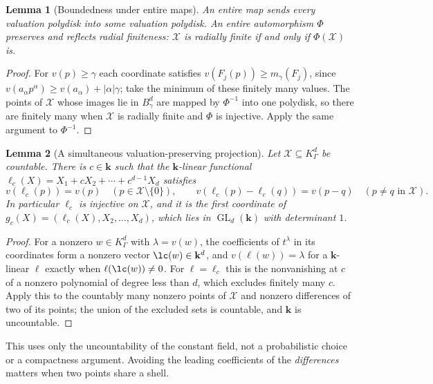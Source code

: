 \documentclass[11pt]{article}
\theoremstyle{plain}
\newtheorem{lemma}[lemma]{Lemma}
\theoremstyle{plain}
\theoremstyle{plain}
\theoremstyle{definition}
\theoremstyle{definition}
\theoremstyle{definition}
\theoremstyle{definition}
\theoremstyle{remark}
\newcommand{\K}{K_\Gamma}\newcommand{\KD}{K_\Delta}
\newcommand{\kk}{\mathbf k}\newcommand{\PP}{\mathbb P}
\begin{document}
\begin{lemma}[Boundedness under entire maps]\label{ent:rc:lem:boundedness}
An entire map sends every valuation polydisk into some valuation polydisk.
An entire automorphism $\Phi$ preserves and reflects radial finiteness:
$\mathcal X$ is radially finite if and only if $\Phi(\mathcal X)$ is.
\end{lemma}
\begin{proof}
For $v(p)\ge\gamma$ each coordinate satisfies $v(F_j(p))\ge m_\gamma(F_j)$,
since $v(a_\alpha p^\alpha)\ge v(a_\alpha)+|\alpha|\gamma$; take the minimum of
these finitely many values. The points of $\mathcal X$ whose images lie in
$B^d_\gamma$ are mapped by $\Phi^{-1}$ into one polydisk, so there are finitely
many when $\mathcal X$ is radially finite and $\Phi$ is injective. Apply the
same argument to $\Phi^{-1}$.
\end{proof}

\begin{lemma}[A simultaneous valuation-preserving projection]
\label{ent:rc:lem:projection}
Let $\mathcal X\subseteq\K^d$ be countable. There is $c\in\kk$ such that the
$\kk$-linear functional $\ell_c(X)=X_1+cX_2+\cdots+c^{d-1}X_d$ satisfies
\begin{equation}\label{ent:rc:eq:project}
 v(\ell_c(p))=v(p)\quad(p\in\mathcal X\setminus\{0\}),\qquad
 v(\ell_c(p)-\ell_c(q))=v(p-q)\quad(p\ne q\text{ in }\mathcal X).
\end{equation}
In particular $\ell_c$ is injective on $\mathcal X$, and it is the first
coordinate of $g_c(X)=(\ell_c(X),X_2,\ldots,X_d)$, which lies in
$\operatorname{GL}_d(\kk)$ with determinant $1$.
\end{lemma}
\begin{proof}
For a nonzero $w\in\K^d$ with $\lambda=v(w)$, the coefficients of $t^\lambda$
in its coordinates form a nonzero vector $\lc(w)\in\kk^d$, and
$v(\ell(w))=\lambda$ for a $\kk$-linear $\ell$ exactly when
$\ell(\lc(w))\ne0$. For $\ell=\ell_c$ this is the nonvanishing
at $c$ of a nonzero polynomial of degree less than $d$, which excludes finitely
many $c$. Apply this to the countably many nonzero points of $\mathcal X$ and
nonzero differences of two of its points; the union of the excluded sets is
countable, and $\kk$ is uncountable.
\end{proof}

This uses only the uncountability of the constant field, not a probabilistic
choice or a compactness argument. Avoiding the leading coefficients of the
\emph{differences} matters when two points share a shell.
\end{document}
